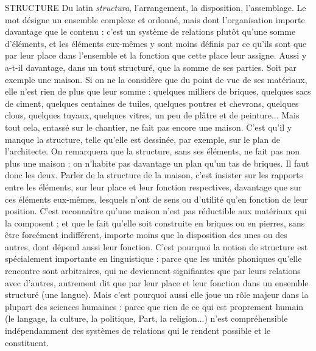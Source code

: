 STRUCTURE Du latin {\it structura}, l’arrangement, la disposition, l’assemblage.
Le mot désigne un ensemble complexe et ordonné, mais dont
l’organisation importe davantage que le contenu : c’est un système de relations
plutôt qu’une somme d’éléments, et les éléments eux-mêmes y sont moins
définis par ce qu’ils sont que par leur place dans l’ensemble et la fonction que
cette place leur assigne. Aussi y a-t-il davantage, dans un tout structuré, que la
somme de ses parties. Soit par exemple une maison. Si on ne la considère que
du point de vue de ses matériaux, elle n’est rien de plus que leur somme :
quelques milliers de briques, quelques sacs de ciment, quelques centaines de
tuiles, quelques poutres et chevrons, quelques clous, quelques tuyaux, quelques
vitres, un peu de plâtre et de peinture... Mais tout cela, entassé sur le chantier,
ne fait pas encore une maison. C’est qu’il y manque la structure, telle qu’elle est
dessinée, par exemple, sur le plan de l’architecte. On remarquera que la structure,
sans ses éléments, ne fait pas non plus une maison : on n’habite pas
davantage un plan qu’un tas de briques. Il faut donc les deux. Parler de la structure
de la maison, c’est insister sur les rapports entre les éléments, sur leur place
et leur fonction respectives, davantage que sur ces éléments eux-mêmes, lesquels
n’ont de sens ou d'utilité qu’en fonction de leur position. C’est reconnaître
qu’une maison n’est pas réductible aux matériaux qui la composent ; et
que le fait qu’elle soit construite en briques ou en pierres, sans être forcément
indifférent, importe moins que la disposition des unes ou des autres, dont
dépend aussi leur fonction. C’est pourquoi la notion de structure est spécialement
importante en linguistique : parce que les unités phoniques qu’elle rencontre
sont arbitraires, qui ne deviennent signifiantes que par leurs relations
avec d’autres, autrement dit que par leur place et leur fonction dans un
ensemble structuré (une langue). Mais c’est pourquoi aussi elle joue un rôle
majeur dans la plupart des sciences humaines : parce que rien de ce qui est proprement
humain (le langage, la culture, la politique, Part, la religion...) n’est
compréhensible indépendamment des systèmes de relations qui le rendent possible
et le constituent.

